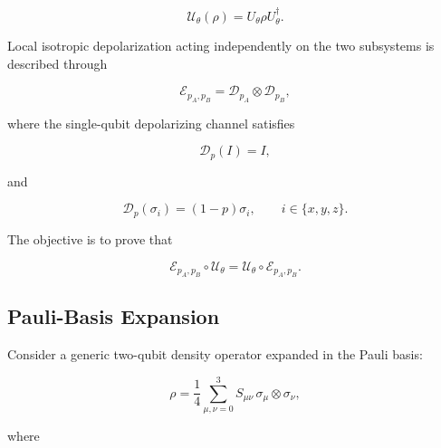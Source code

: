 \begin{equation}
\mathcal{U}_{\theta}(\rho)
=
U_{\theta}\rho U_{\theta}^{\dagger}.
\label{eq:appendix_unitary_channel}
\end{equation}

\medskip

Local isotropic depolarization acting independently on the two subsystems is described through

\begin{equation}
\mathcal{E}_{p_A,p_B}
=
\mathcal{D}_{p_A}
\otimes
\mathcal{D}_{p_B},
\label{eq:appendix_local_depolarizing_channel}
\end{equation}

where the single-qubit depolarizing channel satisfies

\begin{equation}
\mathcal{D}_{p}(I)=I,
\label{eq:appendix_depolarization_identity}
\end{equation}

and

\begin{equation}
\mathcal{D}_{p}(\sigma_i)
=
(1-p)\sigma_i,
\qquad
i\in\{x,y,z\}.
\label{eq:appendix_depolarization_pauli}
\end{equation}

\medskip

The objective is to prove that

\begin{equation}
\mathcal{E}_{p_A,p_B}
\circ
\mathcal{U}_{\theta}
=
\mathcal{U}_{\theta}
\circ
\mathcal{E}_{p_A,p_B}.
\label{eq:appendix_commutation_statement}
\end{equation}


\subsection*{Pauli-Basis Expansion}

Consider a generic two-qubit density operator expanded in the Pauli basis:

\begin{equation}
\rho
=
\frac{1}{4}
\sum_{\mu,\nu=0}^{3}
S_{\mu\nu}\,
\sigma_{\mu}
\otimes
\sigma_{\nu},
\label{eq:appendix_pauli_expansion}
\end{equation}

where

